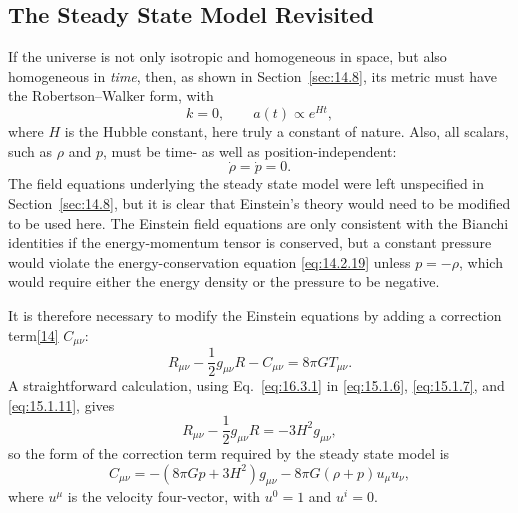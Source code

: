 
\subsection{The Steady State Model Revisited}\label{sec:16.3}

If the universe is not only isotropic and homogeneous in space, but also
homogeneous in \emph{time}, then, as shown in Section~\ref{sec:14.8}, its
metric must have the Robertson--Walker form, with
\begin{equation}
  k=0,
  \qquad
  a(t)\propto e^{Ht},
  \tag{16.3.1}\label{eq:16.3.1}
\end{equation}
where \(H\) is the Hubble constant, here truly a constant of nature. Also, all
scalars, such as \(\rho\) and \(p\), must be time- as well as
position-independent:
\begin{equation}
  \dot\rho=\dot p=0.
  \tag{16.3.2}\label{eq:16.3.2}
\end{equation}
The field equations underlying the steady state model were left unspecified in
Section~\ref{sec:14.8}, but it is clear that Einstein's theory would need to be
modified to be used here. The Einstein field equations are only consistent
with the Bianchi identities if the energy-momentum tensor is conserved, but a
constant pressure would violate the energy-conservation equation
\eqref{eq:14.2.19} unless \(p=-\rho\), which would require either the energy
density or the pressure to be negative.

It is therefore necessary to modify the Einstein equations by adding a
correction term\hyperref[ch16-ref-14]{[14]} \(C_{\mu\nu}\):
\begin{equation}
  R_{\mu\nu}
  -\frac12g_{\mu\nu}R
  -C_{\mu\nu}
  =
  8\pi G T_{\mu\nu}.
  \tag{16.3.3}\label{eq:16.3.3}
\end{equation}
A straightforward calculation, using Eq.~\eqref{eq:16.3.1} in
\eqref{eq:15.1.6}, \eqref{eq:15.1.7}, and \eqref{eq:15.1.11}, gives
\[
  R_{\mu\nu}-\frac12g_{\mu\nu}R=-3H^2g_{\mu\nu},
\]
so the form of the correction term required by the steady state model is
\begin{equation}
  C_{\mu\nu}
  =
  -(8\pi Gp+3H^2)g_{\mu\nu}
  -8\pi G(\rho+p)u_\mu u_\nu,
  \tag{16.3.4}\label{eq:16.3.4}
\end{equation}
where \(u^\mu\) is the velocity four-vector, with \(u^0=1\) and \(u^i=0\).

